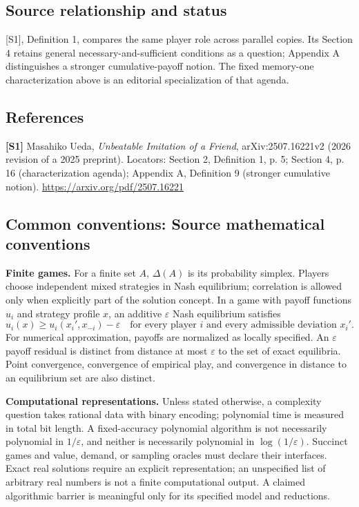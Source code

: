 \documentclass[11pt,a4paper]{article}
\begin{document}
\subsection*{Source relationship and status}
[S1], Definition 1, compares the same player role across parallel copies. Its Section 4 retains general necessary-and-sufficient conditions as a question; Appendix A distinguishes a stronger cumulative-payoff notion. The fixed memory-one characterization above is an editorial specialization of that agenda.
\subsection*{References}
\begingroup\footnotesize\raggedright
\textbf{[S1]} Masahiko Ueda, \emph{Unbeatable Imitation of a Friend}, arXiv:2507.16221v2 (2026 revision of a 2025 preprint). Locators: Section 2, Definition 1, p. 5; Section 4, p. 16 (characterization agenda); Appendix A, Definition 9 (stronger cumulative notion). \url{https://arxiv.org/pdf/2507.16221}
\par\endgroup

\subsection*{Common conventions: Source mathematical conventions}

\textbf{Finite games.} For a finite set $A$, $\Delta(A)$ is its probability
simplex. Players choose independent mixed strategies in Nash equilibrium;
correlation is allowed only when explicitly part of the solution concept.
In a game with payoff functions $u_i$ and strategy profile $x$, an additive
$\varepsilon$ Nash equilibrium satisfies
\[
 u_i(x)\geq u_i(x_i',x_{-i})-\varepsilon
 \quad\text{for every player $i$ and every admissible deviation $x_i'$}.
\]
For numerical approximation, payoffs are normalized as locally specified.
An $\varepsilon$ payoff residual is distinct from distance at most
$\varepsilon$ to the set of exact equilibria. Point convergence, convergence
of empirical play, and convergence in distance to an equilibrium set are
also distinct.

\textbf{Computational representations.} Unless stated otherwise, a complexity
question takes rational data with binary encoding; polynomial time is measured
in total bit length. A fixed-accuracy polynomial algorithm is not necessarily
polynomial in $1/\varepsilon$, and neither is necessarily polynomial in
$\log(1/\varepsilon)$. Succinct games and value, demand, or sampling oracles
must declare their interfaces. Exact real solutions require an explicit
representation; an unspecified list of arbitrary real numbers is not a
finite computational output. A claimed algorithmic barrier is meaningful
only for its specified model and reductions.
\end{document}
